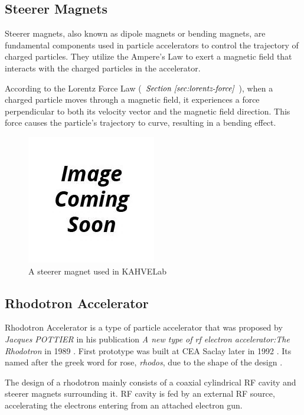 \documentclass[a4paper,oneside,12pt]{report}
\numberwithin{equation}{chapter}
\begin{document}
\subsection{Steerer Magnets}
Steerer magnets, also known as dipole magnets or bending magnets, are fundamental components used in particle accelerators to control the trajectory of charged particles. 
They utilize the Ampere's Law to exert a magnetic field that interacts with the charged particles in the accelerator. 

According to the Lorentz Force Law ( $\textit{Section \ref{sec:lorentz-force}}$ ), when a charged particle moves through a magnetic field, it experiences a force perpendicular to both its velocity 
vector and the magnetic field direction. This force causes the particle's trajectory to curve, resulting in a bending effect.

\begin{figure}[H]
    \centering
    \includegraphics[scale=0.75]{./figures/to_be_added.png}
    \caption{A steerer magnet used in KAHVELab}
\end{figure}

\subsection{Rhodotron Accelerator} \label{sec:theory_rhodo}

Rhodotron Accelerator is a type of particle accelerator that was proposed by \textit{Jacques POTTIER} in his publication \textit{A new type of rf electron accelerator:The Rhodotron} in 1989 \cite{rhodo_pottier}. 
First prototype was built at CEA Saclay later in 1992 \cite{rhodo_prototype}. Its named after the greek word for rose, \textit{rhodos}, due to the shape of the design \cite{rhodos}.

The design of a rhodotron mainly consists of a coaxial cylindrical RF cavity and steerer magnets surrounding it. RF cavity is fed by an external RF source, accelerating the electrons entering from an attached electron gun.
\end{document}
